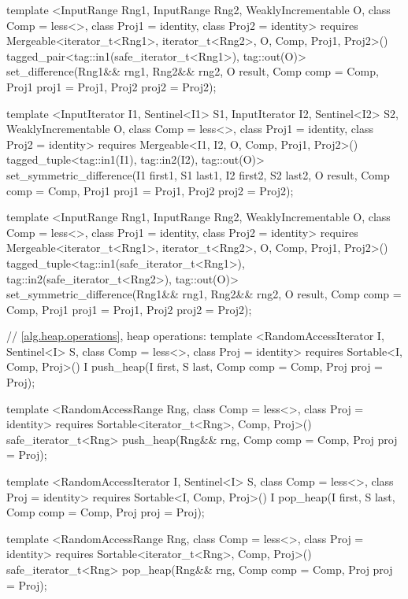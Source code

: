 \begin{codeblock}
{{{{  template <InputRange Rng1, InputRange Rng2, WeaklyIncrementable O,
      class Comp = less<>, class Proj1 = identity, class Proj2 = identity>
    requires Mergeable<iterator_t<Rng1>, iterator_t<Rng2>, O, Comp, Proj1, Proj2>()
    tagged_pair<tag::in1(safe_iterator_t<Rng1>), tag::out(O)>
      set_difference(Rng1&& rng1, Rng2&& rng2, O result,
                     Comp comp = Comp{}, Proj1 proj1 = Proj1{}, Proj2 proj2 = Proj2{});

  template <InputIterator I1, Sentinel<I1> S1, InputIterator I2, Sentinel<I2> S2,
      WeaklyIncrementable O, class Comp = less<>, class Proj1 = identity, class Proj2 = identity>
    requires Mergeable<I1, I2, O, Comp, Proj1, Proj2>()
    tagged_tuple<tag::in1(I1), tag::in2(I2), tag::out(O)>
      set_symmetric_difference(I1 first1, S1 last1, I2 first2, S2 last2, O result,
                               Comp comp = Comp{}, Proj1 proj1 = Proj1{},
                               Proj2 proj2 = Proj2{});

  template <InputRange Rng1, InputRange Rng2, WeaklyIncrementable O,
      class Comp = less<>, class Proj1 = identity, class Proj2 = identity>
    requires Mergeable<iterator_t<Rng1>, iterator_t<Rng2>, O, Comp, Proj1, Proj2>()
    tagged_tuple<tag::in1(safe_iterator_t<Rng1>),
                 tag::in2(safe_iterator_t<Rng2>),
                 tag::out(O)>
      set_symmetric_difference(Rng1&& rng1, Rng2&& rng2, O result, Comp comp = Comp{},
                               Proj1 proj1 = Proj1{}, Proj2 proj2 = Proj2{});

  // \ref{alg.heap.operations}, heap operations:
  template <RandomAccessIterator I, Sentinel<I> S, class Comp = less<>,
      class Proj = identity>
    requires Sortable<I, Comp, Proj>()
    I push_heap(I first, S last, Comp comp = Comp{}, Proj proj = Proj{});

  template <RandomAccessRange Rng, class Comp = less<>, class Proj = identity>
    requires Sortable<iterator_t<Rng>, Comp, Proj>()
    safe_iterator_t<Rng>
      push_heap(Rng&& rng, Comp comp = Comp{}, Proj proj = Proj{});

  template <RandomAccessIterator I, Sentinel<I> S, class Comp = less<>,
      class Proj = identity>
    requires Sortable<I, Comp, Proj>()
    I pop_heap(I first, S last, Comp comp = Comp{}, Proj proj = Proj{});

  template <RandomAccessRange Rng, class Comp = less<>, class Proj = identity>
    requires Sortable<iterator_t<Rng>, Comp, Proj>()
    safe_iterator_t<Rng>
      pop_heap(Rng&& rng, Comp comp = Comp{}, Proj proj = Proj{});

}}}}
\end{codeblock}
